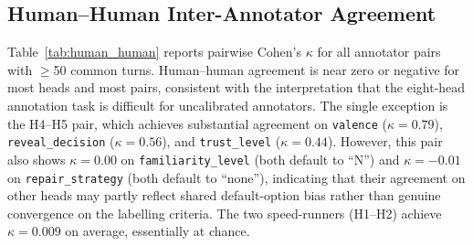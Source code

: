 \documentclass[11pt]{article}
\begin{document}
\begin{table}[tp]
\centering
\caption{Per-annotator human--teacher agreement ($\kappa$). H1--H4 annotated 150 turns; H5 annotated 82. Best $\kappa$ per head is \textbf{bolded}.}
\label{tab:human_teacher}
\footnotesize\setlength{\tabcolsep}{2pt}
\end{table}

\subsection{Human--Human Inter-Annotator Agreement}

Table~\ref{tab:human_human} reports pairwise Cohen's $\kappa$ for all annotator pairs with $\geq$50 common turns.
Human--human agreement is near zero or negative for most heads and most pairs, consistent with the interpretation that the eight-head annotation task is difficult for uncalibrated annotators.
The single exception is the H4--H5 pair, which achieves substantial agreement on \texttt{valence} ($\kappa{=}0.79$), \texttt{reveal\_decision} ($\kappa{=}0.56$), and \texttt{trust\_level} ($\kappa{=}0.44$).
However, this pair also shows $\kappa{=}0.00$ on \texttt{familiarity\_level} (both default to ``N'') and $\kappa{=}-0.01$ on \texttt{repair\_strategy} (both default to ``none''), indicating that their agreement on other heads may partly reflect shared default-option bias rather than genuine convergence on the labelling criteria.
The two speed-runners (H1--H2) achieve $\kappa{=}0.009$ on average, essentially at chance.
\end{document}
